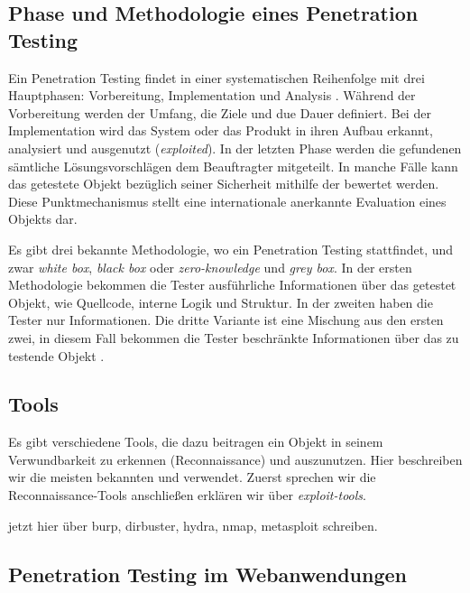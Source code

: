 \subsection{Phase und Methodologie eines Penetration Testing}

Ein Penetration Testing findet in einer systematischen Reihenfolge mit drei Hauptphasen: Vorbereitung, Implementation und Analysis \cite{Hessa_study_pentesting}. Während der Vorbereitung werden der Umfang, die Ziele und due Dauer definiert. Bei der Implementation wird das System oder das Produkt in ihren Aufbau erkannt, analysiert und ausgenutzt (\textit{exploited}). In der letzten Phase werden die gefundenen  sämtliche Lösungsvorschlägen dem Beauftragter mitgeteilt. In manche Fälle kann das getestete Objekt bezüglich seiner Sicherheit mithilfe der  bewertet werden. Diese Punktmechanismus stellt eine internationale anerkannte Evaluation eines Objekts dar. 

Es gibt drei bekannte Methodologie, wo ein Penetration Testing stattfindet, und zwar \textit{white box}, \textit{black box} oder \textit{zero-knowledge} und \textit{grey box}. In der ersten Methodologie bekommen die Tester ausführliche Informationen über das getestet Objekt, wie Quellcode, interne Logik und Struktur. In der zweiten haben die Tester nur  Informationen. Die dritte Variante ist eine Mischung aus den ersten zwei, in diesem Fall bekommen die Tester beschränkte Informationen über das zu testende Objekt \cite{Ehmer_methoden_testen}.

\subsection{Tools}

Es gibt verschiedene Tools, die dazu beitragen ein Objekt in seinem \gls{Verwundbarkeit} zu erkennen (Reconnaissance) und auszunutzen. Hier beschreiben wir die meisten bekannten und verwendet. Zuerst sprechen wir die Reconnaissance-Tools anschließen erklären wir über \textit{exploit-tools}.



jetzt hier über burp, dirbuster, hydra, nmap, metasploit schreiben.

\subsection{Penetration Testing im Webanwendungen}